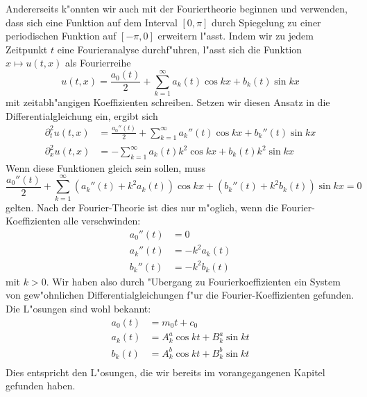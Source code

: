 Andererseits k"onnten wir auch mit der Fouriertheorie beginnen und
verwenden, dass sich eine Funktion auf dem Interval $[0,\pi]$
durch Spiegelung zu einer periodischen Funktion auf $[-\pi,0]$
erweitern l"asst. Indem wir zu jedem Zeitpunkt $t$ eine Fourieranalyse
durchf"uhren, l"asst sich die Funktion $x\mapsto u(t,x)$ als
Fourierreihe 
\[
u(t,x)=\frac{a_0(t)}2+\sum_{k=1}^\infty a_k(t)\cos kx+b_k(t)\sin kx
\]
mit zeitabh"angigen Koeffizienten schreiben.
Setzen wir diesen Ansatz in die Differentialgleichung ein, ergibt sich
\begin{align*}
\partial_t^2u(t,x)&=\frac{a_0''(t)}2
+\sum_{k=1}^\infty a_k''(t)\cos kx+b_k''(t)\sin kx\\
\partial_x^2u(t,x)&=
-\sum_{k=1}^\infty a_k(t)k^2\cos kx+b_k(t)k^2\sin kx
\end{align*}
Wenn diese Funktionen gleich sein sollen, muss
\[
\frac{a_0''(t)}2
+\sum_{k=1}^\infty (a_k''(t)+k^2a_k(t))\cos kx+(b_k''(t)+k^2b_k(t))\sin kx=0
\]
gelten. Nach der Fourier-Theorie ist dies nur m"oglich, wenn die
Fourier-Koeffizienten alle verschwinden:
\begin{align*}
a_0''(t)&=0\\
a_k''(t)&=-k^2a_k(t)\\
b_k''(t)&=-k^2b_k(t)
\end{align*}
mit $k>0$.
Wir haben also durch "Ubergang zu Fourierkoeffizienten ein System
von gew"ohnlichen Differentialgleichungen f"ur die Fourier-Koeffizienten
gefunden. Die L"osungen sind wohl bekannt:
\begin{align*}
a_0(t)&=m_0t+c_0\\
a_k(t)&=A^a_k\cos kt+B^a_k\sin kt\\
b_k(t)&=A^b_k\cos kt+B^b_k\sin kt\\
\end{align*}
Dies entspricht den L"osungen, die wir bereits im vorangegangenen
Kapitel gefunden haben.

